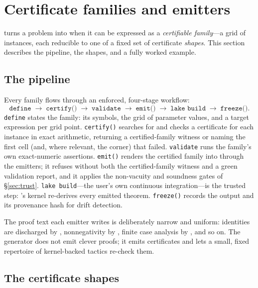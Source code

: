 \section{Certificate families and emitters}
\label{sec:emitters}

\Telperion{} turns a problem into \Lean{} when it can be expressed as a
\emph{certifiable family}---a grid of instances, each reducible to one of a fixed
set of certificate \emph{shapes}. This section describes the pipeline, the shapes,
and a fully worked example.

\subsection{The pipeline}

Every family flows through an enforced, four-stage workflow:
\[
\texttt{define} \;\to\; \texttt{certify()} \;\to\; \texttt{validate} \;\to\;
\texttt{emit()} \;\to\; \texttt{lake build} \;\to\; \texttt{freeze()}.
\]
\texttt{define} states the family: its symbols, the grid of parameter values, and
a target expression per grid point. \texttt{certify()} searches for and checks a
certificate for each instance in exact arithmetic, returning a certified-family
witness or naming the first cell (and, where relevant, the corner) that failed.
\texttt{validate} runs the family's own exact-numeric assertions. \texttt{emit()}
renders the certified family into \Lean{} through the emitters; it refuses without
both the certified-family witness and a green validation report, and it applies the
non-vacuity and soundness gates of \S\ref{sec:trust}. \texttt{lake build}---the
user's own continuous integration---is the trusted step: \Mathlib's kernel
re-derives every emitted theorem. \texttt{freeze()} records the output and its
provenance hash for drift detection.

The proof text each emitter writes is deliberately narrow and uniform: identities
are discharged by ,
nonnegativity by , finite case analysis by ,
and so on. The generator does not emit clever proofs; it emits certificates and lets
a small, fixed repertoire of kernel-backed tactics re-check them.

\subsection{The certificate shapes}

